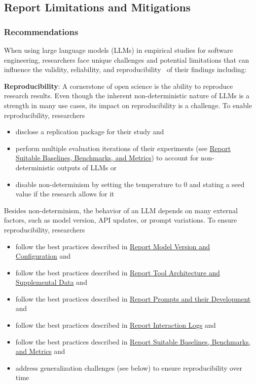 



\subsection{Report Limitations and Mitigations}

\subsubsection{Recommendations}
When using large language models (LLMs) in empirical studies for software engineering, researchers face unique challenges and potential limitations that can influence the validity, reliability, and reproducibility~\cite{sallou2024breaking} of their findings including:

\textbf{Reproducibility}:
A cornerstone of open science is the ability to reproduce research results. Even though the inherent non-deterministic nature of LLMs is a strength in many use cases, its impact on reproducibility is a challenge. To enable reproducibility, researchers 
\begin{itemize}
  \item \must disclose a replication package for their study and
  \item \should perform multiple evaluation iterations of their experiments (see \href{/guidelines/report-baselines-benchmarks-and-metrics}{Report Suitable Baselines, Benchmarks, and Metrics}) to account for non-deterministic outputs of LLMs or
  \item \may disable non-determinism by setting the temperature to 0 and stating a seed value if the research allows for it
\end{itemize}
Besides non-determinism, the behavior of an LLM depends on many external factors, such as model version, API updates, or prompt variations. To ensure reproducibility, researchers
\begin{itemize}
  \item \should follow the best practices described in \href{/guidelines/report-version-and-configuration}{Report Model Version and Configuration} and
  \item \should follow the best practices described in \href{/guidelines/report-architecture-and-data}{Report Tool Architecture and Supplemental Data} and
  \item \should follow the best practices described in \href{/guidelines/report-prompts}{Report Prompts and their Development} and
  \item \should follow the best practices described in \href{/guidelines/report-interaction-logs}{Report Interaction Logs} and
  \item \should follow the best practices described in \href{/guidelines/report-baselines-benchmarks-and-metrics}{Report Suitable Baselines, Benchmarks, and Metrics} and
  \item \should address generalization challenges (see below) to ensure reproducibility over time
\end{itemize}

